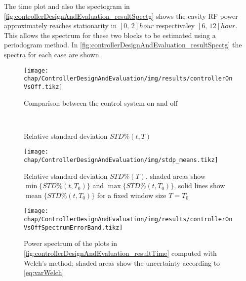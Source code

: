 The time plot and also the spectogram in \autoref{fig:controllerDesignAndEvaluation_resultSpectg} shows the cavity RF power approximately reaches stationarity in $[0,\,2] \si{hour}$ respectivaley $[6,\,12] \si{hour}$. This allows the spectrum for these two blocks to be estimated using a periodogram method. In \autoref{fig:controllerDesignAndEvaluation_resultSpectg} the spectra for each case are shown.

\begin{figure}[tbh]
	\centering
	\texttt{[image: chap/ControllerDesignAndEvaluation/img/results/controllerOnVsOff.tikz]}
	\caption{Comparison between the control system on and off}
	\label{fig:controllerDesignAndEvaluation_resultComp}
\end{figure}

\begin{figure}[tbh]
    \centering
        \\
       \caption{Relative standard deviation $STD\%(t,T)$}
    \label{fig:controllerDesignAndEvaluation_resultSTDp}
\end{figure}

\begin{figure}[tbh]
	\centering
	\texttt{[image: chap/ControllerDesignAndEvaluation/img/stdp\_means.tikz]}
	\caption{Relative standard deviation $STD\%(T)$, shaded areas show $\operatorname{min}\{STD\%(t,T_0)\}$ and $\operatorname{max}\{STD\%(t,T_0)\}$, solid lines show $\operatorname{mean}\{STD\%(t,T_0)\}$ for a fixed window size $T=T_0$}
	\label{fig:controllerDesignAndEvaluation_resultSTDp_means}
\end{figure}


\begin{figure}[tbh]
	\centering
	\texttt{[image: chap/ControllerDesignAndEvaluation/img/results/controllerOnVsOffSpectrumErrorBand.tikz]}
	\caption{Power spectrum of the plots in \autoref{fig:controllerDesignAndEvaluation_resultTime} computed with Welch's method; shaded areas show the uncertainty according to \autoref{eq:varWelch}}
	\label{fig:controllerDesignAndEvaluation_resultPeriodo}
\end{figure}


